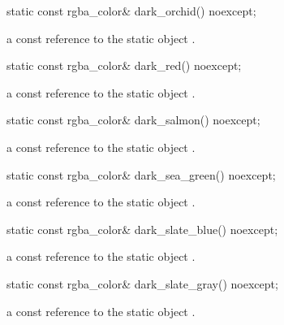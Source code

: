 \begin{itemdecl}
static const rgba_color& dark_orchid() noexcept;
\end{itemdecl}
\begin{itemdescr}
\pnum
\returns
a const reference to the static  object .
\end{itemdescr}

\begin{itemdecl}
static const rgba_color& dark_red() noexcept;
\end{itemdecl}
\begin{itemdescr}
\pnum
\returns
a const reference to the static  object .
\end{itemdescr}

\begin{itemdecl}
static const rgba_color& dark_salmon() noexcept;
\end{itemdecl}
\begin{itemdescr}
\pnum
\returns
a const reference to the static  object .
\end{itemdescr}

\begin{itemdecl}
static const rgba_color& dark_sea_green() noexcept;
\end{itemdecl}
\begin{itemdescr}
\pnum
\returns
a const reference to the static  object .
\end{itemdescr}

\begin{itemdecl}
static const rgba_color& dark_slate_blue() noexcept;
\end{itemdecl}
\begin{itemdescr}
\pnum
\returns
a const reference to the static  object .
\end{itemdescr}

\begin{itemdecl}
static const rgba_color& dark_slate_gray() noexcept;
\end{itemdecl}
\begin{itemdescr}
\pnum
\returns
a const reference to the static  object .
\end{itemdescr}

